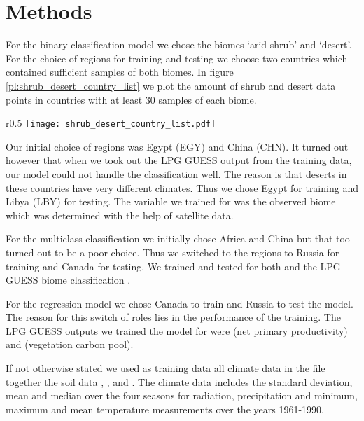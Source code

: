 
\section{Methods}

For the binary classification model we chose the biomes `arid shrub' and `desert'. For the choice of regions for training and testing
we  choose two countries which contained sufficient samples of both biomes.
In figure \ref{pl:shrub_desert_country_list} we plot the amount of shrub and desert data points in countries with at least
30 samples of each biome.
\begin{wrapfigure}{r}{0.5\textwidth}
  \centering
  \texttt{[image: shrub\_desert\_country\_list.pdf]}
  \caption{Amount of shrub and desert landscape in selected countries.}
  \label{pl:shrub_desert_country_list}
\end{wrapfigure}
Our initial choice of regions was Egypt (EGY) and China (CHN).
It turned out however that when we took out the LPG GUESS output from the training data, our model could not handle the classification well.
The reason is that deserts in these countries have very different climates. Thus we chose Egypt for training and Libya (LBY) for testing.
The variable we trained for was the observed biome  which was determined with the help of satellite data.

For the multiclass classification we initially chose Africa and China but that too turned out to be a poor choice.
Thus we switched to the regions to Russia for training and Canada for testing. We trained and tested for both
 and the LPG GUESS biome classification .

For the regression model we chose Canada to train and Russia to test the model. The reason for this switch of roles lies in the performance
of the training. The LPG GUESS outputs we trained the model for were  (net primary productivity) and  (vegetation carbon pool).

If not otherwise stated we used as training data all climate data in the file  together the soil data , ,  and .
The climate data includes the standard deviation, mean and median over the four seasons for radiation,
precipitation and minimum, maximum and mean temperature measurements over the years 1961-1990.

